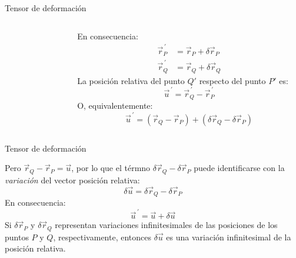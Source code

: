 \documentclass[11pt,handout,aspectratio=1610]{beamer}
\begin{document}
\begin{frame}{Tensor de deformación}
\begin{columns}
\begin{column}{0.45\textwidth}
\begin{figure}
            \end{figure}
        \end{column}
        \begin{column}{0.45\textwidth}
            En consecuencia:
            \begin{align*}
                \vec{r}_P^{\, \prime} &= \vec{r}_P + \delta \vec{r}_P \\
                \vec{r}_Q^{\, \prime} &= \vec{r}_Q + \delta \vec{r}_Q
            \end{align*} La posición relativa del punto $Q'$ respecto del punto $P'$ es: $$ \vec{u}^{\, \prime} = \vec{r}_Q^{\,\prime} - \vec{r}_P^{\,\prime}$$ O, equivalentemente: $$ \vec{u}^{\, \prime} = \left(\vec{r}_Q - \vec{r}_P\right) + \left(\delta \vec{r}_Q - \delta \vec{r}_P\right) $$
        \end{column}
    \end{columns}

\end{frame}

\begin{frame}{Tensor de deformación}

    Pero $\vec{r}_Q - \vec{r}_P = \vec{u}$, por lo que el térmno $\delta \vec{r}_Q - \delta \vec{r}_P$ puede identificarse con la \emph{variación} del vector posición relativa: $$ \delta \vec{u} = \delta \vec{r}_Q - \delta \vec{r}_P$$ En consecuencia: $$ \vec{u}^{\, \prime} = \vec{u} + \delta \vec{u}$$ Si $\delta \vec{r}_P$ y $\delta \vec{r}_Q$ representan variaciones infinitesimales de las posiciones de los puntos $P$ y $Q$, respectivamente, entonces $\delta \vec{u}$ es una variación infinitesimal de la posición relativa.

\end{frame}
\end{document}
